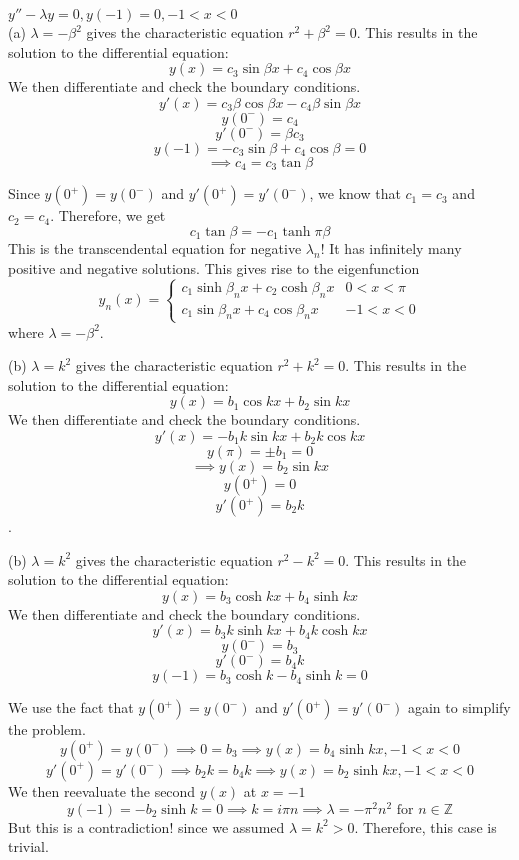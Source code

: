 \documentclass[12pt]{article}
\numberwithin{equation}{section}
\begin{document}
\begin{enumerate}
\begin{enumerate}
\begin{multicols}{2}
            $y''-\lambda y=0,y(-1)=0,-1<x<0$\\
                (a) $\lambda=-\beta^2$ gives the characteristic equation $r^2+\beta^2=0$. This results in the solution to the differential equation:
                $$y(x)=c_3\sin{\beta x}+c_4\cos{\beta x}$$
                We then differentiate and check the boundary conditions.
                $$y'(x)=c_3\beta\cos{\beta x}-c_4\beta\sin{\beta x}$$
                $$y(0^-)=c_4$$
                $$y'(0^-)=\beta c_3$$
                $$y(-1)=-c_3\sin{\beta}+c_4\cos{\beta}=0$$
                $$\implies c_4=c_3\tan{\beta}$$
            \end{multicols}
            Since $y(0^+)=y(0^-)$ and $y'(0^+)=y'(0^-)$, we know that $c_1=c_3$ and $c_2=c_4$. Therefore, we get
            $$c_1\tan{\beta}=-c_1\tanh{\pi\beta}$$
            This is the transcendental equation for negative $\lambda_n$! It has infinitely many positive and negative solutions. This gives rise to the eigenfunction
            $$y_n(x)=\left\{\begin{array}{cc}c_1\sinh{\beta_n x}+c_2\cosh{\beta_n x} & 0<x<\pi\\ c_1\sin{\beta_n x}+c_4\cos{\beta_n x} & -1<x<0\end{array}\right.$$
            where $\lambda=-\beta^2$.
            \begin{multicols}{2}
                (b) $\lambda=k^2$ gives the characteristic equation $r^2+k^2=0.$ This results in the solution to the differential equation:
                $$y(x)=b_1\cos{kx}+b_2\sin{kx}$$
                We then differentiate and check the boundary conditions.
                $$y'(x)=-b_1k\sin{kx}+b_2k\cos{k x}$$
                $$y(\pi)=\pm b_1=0$$
                $$\implies y(x)=b_2\sin{kx}$$
                $$y(0^+)=0$$
                $$y'(0^+)=b_2k$$
                .
                \columnbreak

                (b) $\lambda=k^2$ gives the characteristic equation $r^2-k^2=0$. This results in the solution to the differential equation:
                $$y(x)=b_3\cosh{kx}+b_4\sinh{kx}$$
                We then differentiate and check the boundary conditions.
                $$y'(x)=b_3k\sinh{kx}+b_4k\cosh{kx}$$
                $$y(0^-)=b_3$$
                $$y'(0^-)=b_4k$$
                $$y(-1)=b_3\cosh{k}-b_4\sinh{k}=0$$
            \end{multicols}
            We use the fact that $y(0^+)=y(0^-)$ and $y'(0^+)=y'(0^-)$ again to simplify the problem. $$y(0^+)=y(0^-)\implies 0=b_3\implies y(x)=b_4\sinh{kx},-1<x<0$$
            $$y'(0^+)=y'(0^-)\implies b_2k=b_4k\implies y(x)=b_2\sinh{kx},-1<x<0$$
            We then reevaluate the second $y(x)$ at $x=-1$
            $$y(-1)=-b_2\sinh{k}=0\implies k=i\pi n\implies \lambda=-\pi^2n^2 \text{ for }n\in\mathbb{Z}$$
            But this is a contradiction! since we assumed $\lambda=k^2>0$. Therefore, this case is trivial.


\end{enumerate}
\end{enumerate}
\end{document}
